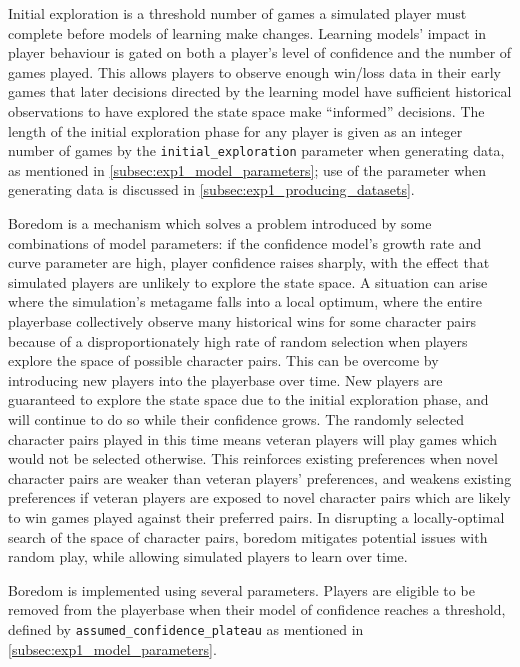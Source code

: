  Initial
exploration is a threshold number of games a simulated player must complete
before models of learning make changes. Learning models' impact in player
behaviour is gated on both a player's level of confidence and the number of
games played. This allows players to observe enough win/loss data in their early
games that later decisions directed by the learning model have sufficient
historical observations to have explored the state space make ``informed''
decisions. The length of the initial exploration phase for any player is given
as an integer number of games by the \lstinline{initial_exploration} parameter
when generating data, as mentioned in \cref{subsec:exp1_model_parameters}; use
of the parameter when generating data is discussed in
\cref{subsec:exp1_producing_datasets}.

Boredom is a mechanism which solves a problem introduced by some combinations of
model parameters: if the confidence model's growth rate and curve parameter are
high, player confidence raises sharply, with the effect that simulated players
are unlikely to explore the state space. A situation can arise where the
simulation's metagame falls into a local optimum, where the entire playerbase
collectively observe many historical wins for some character pairs because of a
disproportionately high rate of random selection when players explore the space
of possible character pairs. This can be overcome by introducing new players
into the playerbase over time. New players are guaranteed to explore the state
space due to the initial exploration phase, and will continue to do so while
their confidence grows. The randomly selected character pairs played in this
time means veteran players will play games which would not be selected
otherwise. This reinforces existing preferences when novel character pairs are
weaker than veteran players' preferences, and weakens existing preferences if
veteran players are exposed to novel character pairs which are likely to win
games played against their preferred pairs. In disrupting a locally-optimal
search of the space of character pairs, boredom mitigates potential issues with
random play, while allowing simulated players to learn over time.

Boredom is implemented using several parameters. Players are eligible to be
removed from the playerbase when their model of confidence reaches a threshold,
defined by \lstinline{assumed_confidence_plateau} as mentioned in
\cref{subsec:exp1_model_parameters}. 




